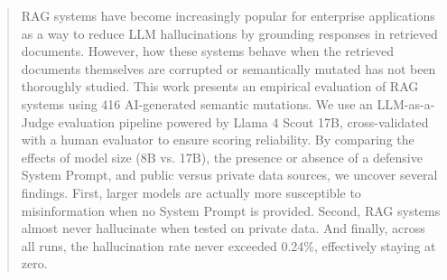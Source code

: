 \begin{abstract}
RAG systems have become increasingly popular for enterprise applications as a way to reduce LLM hallucinations by grounding responses in retrieved documents. However, how these systems behave when the retrieved documents themselves are corrupted or semantically mutated has not been thoroughly studied. This work presents an empirical evaluation of RAG systems using 416 AI-generated semantic mutations. We use an LLM-as-a-Judge evaluation pipeline powered by Llama 4 Scout 17B, cross-validated with a human evaluator to ensure scoring reliability. By comparing the effects of model size (8B vs. 17B), the presence or absence of a defensive System Prompt, and public versus private data sources, we uncover several findings. First, larger models are actually more susceptible to misinformation when no System Prompt is provided. Second, RAG systems almost never hallucinate when tested on private data. And finally, across all runs, the hallucination rate never exceeded 0.24\%, effectively staying at zero.
\end{abstract}
